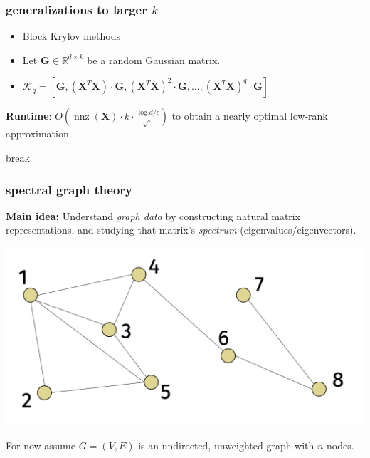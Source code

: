 \documentclass[compress]{beamer}
\newcommand{\bv}[1]{\mathbf{#1}}
\newcommand{\R}{\mathbb{R}}
\DeclareMathOperator{\nnz}{nnz}
\begin{document}
\begin{frame}[t]
	\frametitle{generalizations to larger $k$}
	\begin{itemize}
		\item Block Krylov methods
	\end{itemize}
	
	\begin{itemize}
		\item Let $\bv{G}\in \R^{d\times k}$ be a random Gaussian matrix.
		\item  $\mathcal{K}_q = \left[\bv{G}, \left(\bv{X}^T\bv{X}\right) \cdot \bv{G}, \left(\bv{X}^T\bv{X}\right)^2 \cdot \bv{G}, \ldots, \left(\bv{X}^T\bv{X}\right)^q \cdot \bv{G}\right]$
	\end{itemize}
	
	\begin{center}
		\alert{\textbf{Runtime}:} $O\left(\nnz(\bv{X}) \cdot k \cdot \frac{\log d/\epsilon}{\sqrt{\epsilon}}\right)$ to obtain a nearly optimal low-rank approximation.
	\end{center}
\end{frame}

\begin{frame}[standout]
	\begin{center}
			\large break
		\end{center}
\end{frame}

\begin{frame}
	\frametitle{spectral graph theory}
	\textbf{Main idea:} Understand \emph{graph data} by constructing natural matrix representations, and studying that matrix's \emph{spectrum} (eigenvalues/eigenvectors).
	\begin{center}
		\includegraphics[width=.8\textwidth]{undirected_graph.png}
		
		For now assume $G = (V,E)$ is an undirected, unweighted graph with $n$ nodes.
	\end{center}
\end{frame}
\end{document}
